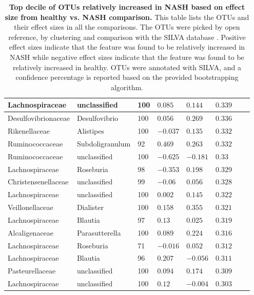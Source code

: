 \begin{table}[!ht]
\begin{tiny}
\begin{tabular}{|l|l|l|l|l|l|l|l|}
Lachnospiraceae & unclassified & 100 & $0.085$ & $0.144$ & $0.339$ \\ \hline
Desulfovibrionaceae & Desulfovibrio & 100 & $0.056$ & $0.269$ & $0.336$ \\ \hline
Rikenellaceae & Alistipes & 100 & $-0.037$ & $0.135$ & $0.332$ \\ \hline
Ruminococcaceae & Subdoligranulum & 92 & $0.469$ & $0.263$ & $0.332$ \\ \hline
Ruminococcaceae & unclassified & 100 & $-0.625$ & $-0.181$ & $0.33$ \\ \hline
Lachnospiraceae & Roseburia & 98 & $-0.353$ & $0.198$ & $0.329$ \\ \hline
Christensenellaceae & unclassified & 99 & $-0.06$ & $0.056$ & $0.328$ \\ \hline
Lachnospiraceae & unclassified & 100 & $0.002$ & $0.145$ & $0.322$ \\ \hline
Veillonellaceae & Dialister & 100 & $0.158$ & $0.355$ & $0.321$ \\ \hline
Lachnospiraceae & Blautia & 97 & $0.13$ & $0.025$ & $0.319$ \\ \hline
Alcaligenaceae & Parasutterella & 100 & $0.089$ & $0.224$ & $0.316$ \\ \hline
Lachnospiraceae & Roseburia & 71 & $-0.016$ & $0.052$ & $0.312$ \\ \hline
Lachnospiraceae & Blautia & 96 & $0.207$ & $-0.056$ & $0.311$ \\ \hline
Pasteurellaceae & unclassified & 100 & $0.094$ & $0.174$ & $0.309$ \\ \hline
Lachnospiraceae & unclassified & 100 & $0.12$ & $-0.004$ & $0.303$ \\ \hline
\end{tabular}
\end{tiny}
\caption[Top decile of OTUs relatively increased in NASH based on effect size from healthy vs. NASH comparison.]{ \textbf{Top decile of OTUs relatively increased in NASH based on effect size from healthy vs. NASH comparison.} This table lists the OTUs and their effect sizes in all the comparisons. The OTUs were picked by open reference, by clustering and comparison with the SILVA database \cite{quast2013silva}. Positive effect sizes indicate that the feature was found to be relatively increased in NASH while negative effect sizes indicate that the feature was found to be relatively increased in healthy. OTUs were annotated with SILVA, and a confidence percentage is reported based on the provided bootstrapping algorithm.}
\label{nafld_top_otu_table}
\end{table}


